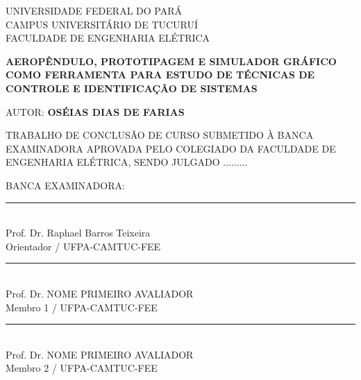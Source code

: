 
	\thispagestyle{empty}
	
	\begin{center}
			UNIVERSIDADE FEDERAL DO PARÁ\\
			CAMPUS UNIVERSITÁRIO DE TUCURUÍ\\
			FACULDADE DE ENGENHARIA ELÉTRICA
			
			\vspace{0.1cm}
			

			\textbf{AEROPÊNDULO, PROTOTIPAGEM E SIMULADOR GRÁFICO COMO FERRAMENTA PARA ESTUDO DE TÉCNICAS DE CONTROLE E IDENTIFICAÇÃO DE SISTEMAS}
			
			\vspace{-0.1cm}
			
			\begin{flushleft}
				AUTOR:\textbf{ OSÉIAS DIAS DE FARIAS}
			\end{flushleft}
			\vspace{-0.1cm}
	\end{center}

			\par\noindent \small{TRABALHO DE CONCLUSÃO DE CURSO SUBMETIDO  À BANCA EXAMINADORA APROVADA PELO COLEGIADO DA FACULDADE DE ENGENHARIA ELÉTRICA, SENDO JULGADO .........}
			


			\begin{center}
			\begin{flushleft}
			BANCA EXAMINADORA:	
			\end{flushleft}
		
			\vspace{0.45cm}
		
			\par\noindent\rule{0.7\textwidth}{0.2pt}\\ \vspace{-0.2cm}
			Prof. Dr. Raphael Barros Teixeira\\ \vspace{-0.2cm}
			{\small Orientador / UFPA-CAMTUC-FEE}
			\vspace{0.3cm}
			
			\par\noindent\rule{0.7\textwidth}{0.2pt}\\ \vspace{-0.2cm}
			Prof. Dr. NOME PRIMEIRO AVALIADOR\\ \vspace{-0.2cm}
			{\small Membro 1 / UFPA-CAMTUC-FEE}
			\vspace{0.3cm}

   		\par\noindent\rule{0.7\textwidth}{0.2pt}\\ \vspace{-0.2cm}
			Prof. Dr. NOME PRIMEIRO AVALIADOR\\ \vspace{-0.2cm}
			{\small Membro 2 / UFPA-CAMTUC-FEE}
			\vspace{0.3cm}

			
	\end{center}
